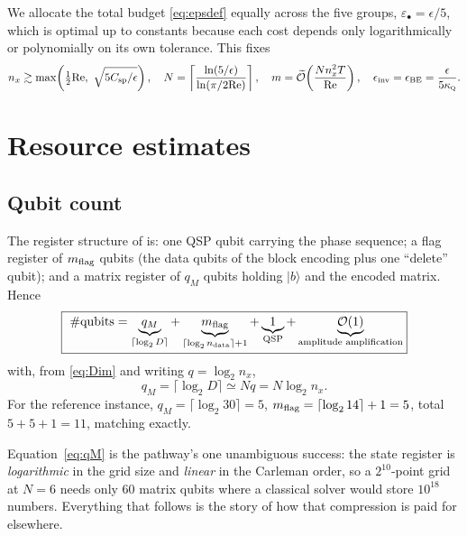 \documentclass[11pt,a4paper]{article}
\theoremstyle{plain}
\theoremstyle{definition}
\theoremstyle{remark}
\newcommand{\Rey}{\mathrm{Re}}
\newcommand{\Oh}{\mathcal{O}}
\newcommand{\Ot}{\widetilde{\mathcal{O}}}
\newcommand{\ket}[1]{\lvert #1 \rangle}
\newcommand{\kQ}{\kappa_{\textsc{q}}}
\begin{document}
We allocate the total budget \eqref{eq:epsdef} equally across the five groups,
$\varepsilon_\bullet=\epsilon/5$, which is optimal up to constants because each
cost depends only logarithmically or polynomially on its own tolerance.  This
fixes
\begin{equation}
n_x\gtrsim\max\!\left(\tfrac12\Rey,\ \sqrt{5C_{\rm sp}/\epsilon}\right),
\quad
N=\left\lceil\frac{\ln(5/\epsilon)}{\ln(\pi/2\Rey)}\right\rceil,
\quad
m=\Ot\!\left(\frac{Nn_x^2T}{\Rey}\right),
\quad
\epsilon_{\rm inv}=\epsilon_{\rm BE}=\frac{\epsilon}{5\kQ}.
\label{eq:allocation}
\end{equation}

\section{Resource estimates}
\label{sec:resources}

\subsection{Qubit count}
\label{sec:qubits}

The register structure of \cite[Fig.~2]{Setty2026} is: one QSP qubit carrying
the phase sequence; a flag register of $m_{\rm flag}$ qubits (the data qubits of
the block encoding plus one ``delete'' qubit); and a matrix register of $q_M$
qubits holding $\ket{b}$ and the encoded matrix.  Hence
\begin{equation}
\boxed{\
\#\text{qubits} = \underbrace{q_M}_{\lceil\log_2 D\rceil}
+\underbrace{m_{\rm flag}}_{\lceil\log_2 n_{\rm data}\rceil+1}
+\underbrace{1}_{\rm QSP}
+\underbrace{\Oh(1)}_{\text{amplitude amplification}} }
\label{eq:qubits}
\end{equation}
with, from \eqref{eq:Dim} and writing $q=\log_2 n_x$,
\begin{equation}
q_M=\bigl\lceil\log_2 D\bigr\rceil\simeq N q
= N\log_2 n_x .
\label{eq:qM}
\end{equation}
For the reference instance, $q_M=\lceil\log_2 30\rceil=5$,
$m_{\rm flag}=\lceil\log_2 14\rceil+1=5$, total $5+5+1=11$, matching
\cite[Table~4]{Setty2026} exactly.

Equation~\eqref{eq:qM} is the pathway's one unambiguous success: the state
register is \emph{logarithmic} in the grid size and \emph{linear} in the
Carleman order, so a $2^{10}$-point grid at $N=6$ needs only $60$ matrix qubits
where a classical solver would store $10^{18}$ numbers.  Everything that follows
is the story of how that compression is paid for elsewhere.
\end{document}
